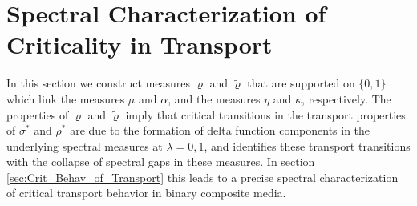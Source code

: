 \documentclass[english,12pt,jmp,graphicx]{revtex4-1}
\begin{document}
%
%
%
\section{Spectral Characterization of Criticality in
  Transport} \label{sec:Measure_Equivalences}   
%
In this section we construct measures $\varrho$ and $\tilde{\varrho}$ that are
supported on $\{0,1\}$ which link the measures $\mu$ and $\alpha$, and the
measures $\eta$ and $\kappa$, respectively. The properties of $\varrho$ and
$\tilde{\varrho}$ imply that critical transitions in the transport
properties of $\sigma^*$ and $\rho^*$ are due to the formation of delta
function components in the underlying spectral measures at
$\lambda=0,1$, and identifies these transport transitions with the collapse
of spectral gaps in these measures. In section
\ref{sec:Crit_Behav_of_Transport} this leads to a precise spectral
characterization of critical transport behavior in binary composite media. 

\end{document}
